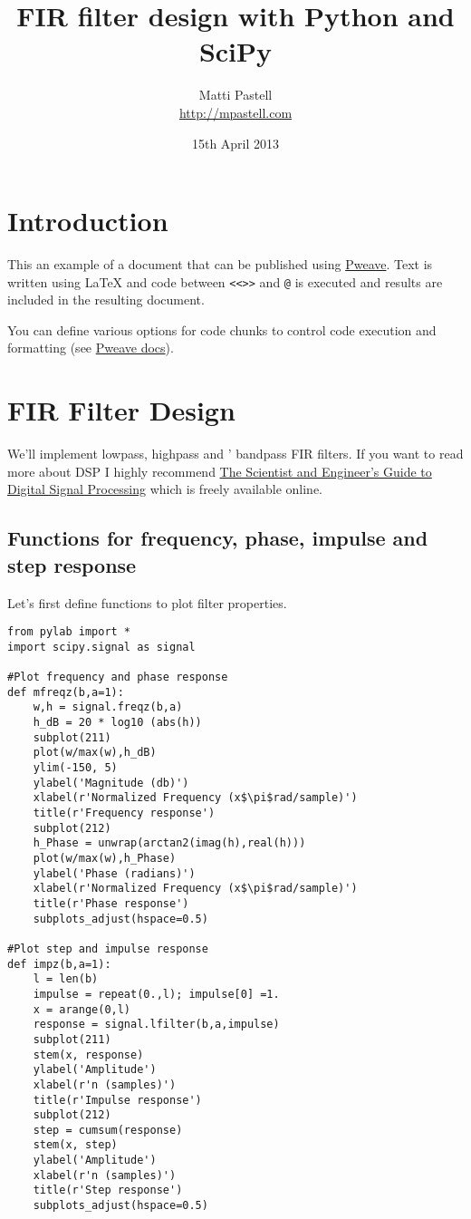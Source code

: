 \documentclass[a4paper,11pt,final]{article}
\title{FIR filter design with Python and SciPy}
\author{Matti Pastell \\ \url{http://mpastell.com}}
\date{15th April 2013}
\begin{document}
\maketitle


\section{Introduction}

This an example of a document that can be published using
\href{http://mpastell.com/pweave}{Pweave}. Text is written
using \LaTeX{} and code between \texttt{<<>>} and \texttt{@} is executed
and results are included in the resulting document.

You can define various options for code chunks to control code
execution and formatting (see
\href{http://mpastell.com/pweave/usage.html\#code-chunk-options}{Pweave
docs}).

\section{FIR Filter Design}

We'll implement lowpass, highpass and ' bandpass FIR filters. If you
want to read more about DSP I highly recommend
\href{http://www.dspguide.com/}{The Scientist and Engineer's Guide to
Digital Signal Processing} which is freely available online.

\subsection{Functions for frequency, phase, impulse and step response}

Let's first define functions to plot filter properties.



\begin{verbatim}
from pylab import *
import scipy.signal as signal
    
#Plot frequency and phase response
def mfreqz(b,a=1):
    w,h = signal.freqz(b,a)
    h_dB = 20 * log10 (abs(h))
    subplot(211)
    plot(w/max(w),h_dB)
    ylim(-150, 5)
    ylabel('Magnitude (db)')
    xlabel(r'Normalized Frequency (x$\pi$rad/sample)')
    title(r'Frequency response')
    subplot(212)
    h_Phase = unwrap(arctan2(imag(h),real(h)))
    plot(w/max(w),h_Phase)
    ylabel('Phase (radians)')
    xlabel(r'Normalized Frequency (x$\pi$rad/sample)')
    title(r'Phase response')
    subplots_adjust(hspace=0.5)

#Plot step and impulse response
def impz(b,a=1):
    l = len(b)
    impulse = repeat(0.,l); impulse[0] =1.
    x = arange(0,l)
    response = signal.lfilter(b,a,impulse)
    subplot(211)
    stem(x, response)
    ylabel('Amplitude')
    xlabel(r'n (samples)')
    title(r'Impulse response')
    subplot(212)
    step = cumsum(response)
    stem(x, step)
    ylabel('Amplitude')
    xlabel(r'n (samples)')
    title(r'Step response')
    subplots_adjust(hspace=0.5)
\end{verbatim}
\end{document}
